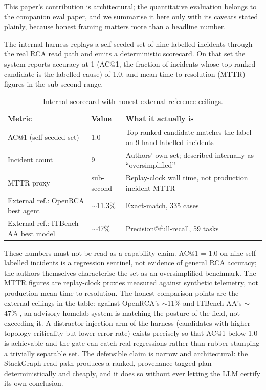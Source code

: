 \documentclass[11pt]{article}
\begin{document}
This paper's contribution is architectural; the quantitative evaluation belongs
to the companion eval paper, and we summarise it here only with its caveats
stated plainly, because honest framing matters more than a headline number.

The internal harness replays a self-seeded set of nine labelled incidents through
the real RCA read path and emits a deterministic scorecard. On that set the
system reports accuracy-at-1 (AC@1, the fraction of incidents whose top-ranked
candidate is the labelled cause) of 1.0, and mean-time-to-resolution (MTTR)
figures in the sub-second range.

\begin{table}[h]
\centering
\small
\begin{tabular}{lll}
\toprule
\textbf{Metric} & \textbf{Value} & \textbf{What it actually is} \\
\midrule
AC@1 (self-seeded set) & 1.0 & Top-ranked candidate matches the label on 9 hand-labelled incidents \\
Incident count & 9 & Authors' own set; described internally as ``oversimplified'' \\
MTTR proxy & sub-second & Replay-clock wall time, not production incident MTTR \\
External ref.: OpenRCA best agent & $\sim$11.3\% & Exact-match, 335 cases \citep{xu2025openrca} \\
External ref.: ITBench-AA best model & $\sim$47\% & Precision@full-recall, 59 tasks \citep{itbenchaa2026} \\
\bottomrule
\end{tabular}
\caption{Internal scorecard with honest external reference ceilings.}
\end{table}

These numbers must not be read as a capability claim. AC@1 = 1.0 on nine
self-labelled incidents is a regression sentinel, not evidence of general RCA
accuracy; the authors themselves characterise the set as an oversimplified
benchmark. The MTTR figures are replay-clock proxies measured against synthetic
telemetry, not production mean-time-to-resolution. The honest comparison points
are the external ceilings in the table: against OpenRCA's $\sim$11\%
\citep{xu2025openrca} and ITBench-AA's $\sim$47\% \citep{itbenchaa2026}, an
advisory homelab system is matching the posture of the field, not exceeding it. A
distractor-injection arm of the harness (candidates with higher topology
criticality but lower error-rate) exists precisely so that AC@1 below 1.0 is
achievable and the gate can catch real regressions rather than rubber-stamping a
trivially separable set. The defensible claim is narrow and architectural: the
StackGraph read path produces a ranked, provenance-tagged plan deterministically
and cheaply, and it does so without ever letting the LLM certify its own
conclusion.
\end{document}
